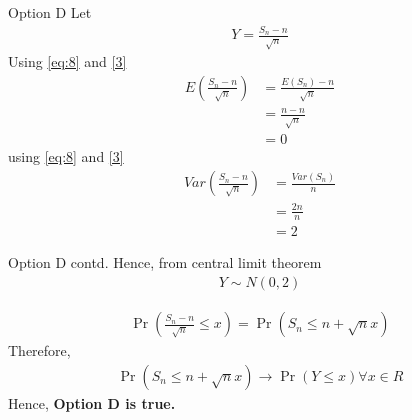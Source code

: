 \documentclass{beamer}
\providecommand{\pr}[1]{\ensuremath{\Pr\left(#1\right)}}
\begin{document}
\begin{frame}{Option D}
Let 
\begin{align}
    Y=\frac{S_{n}-n}{\sqrt{n}}
\end{align}
Using \eqref{eq:8} and \eqref{3}
\begin{align}
    E\left(\frac{S_{n}-n}{\sqrt{n}}\right)&=\frac{E(S_n)-n}{\sqrt{n}}\\
    &=\frac{n-n}{\sqrt{n}}\\
    &=0
\end{align}
using \eqref{eq:8} and \eqref{3}
\begin{align}
     Var\left(\frac{S_{n}-n}{\sqrt{n}}\right)&=\frac{Var(S_n)}{n}\\
     &=\frac{2n}{n}\\
     &=2
\end{align}
\end{frame}
\begin{frame}{Option D contd.}
Hence, from central limit theorem
\begin{align}
    Y \sim N(0,2)\label{eq:D}
\end{align}

\begin{align}
     \pr{\frac{S_{n}-n}{\sqrt{n}} \leq x}= \pr{S_{n} \leq n+\sqrt{n}x}
\end{align}
Therefore,
\begin{align}
   \pr{S_n \leq n+ \sqrt{n}x} \rightarrow \pr{Y \leq x} \forall x \in R \label{new}
\end{align}
Hence, \textbf{Option D is true.}
    
\end{frame}
\end{document}
